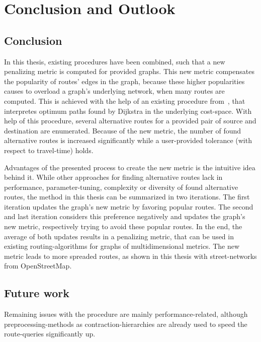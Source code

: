 \chapter{Conclusion and Outlook}
\label{chap:conclusion}

\section{Conclusion}

    In this thesis, existing procedures have been combined, such that a new penalizing metric is computed for provided graphs.
    This new metric compensates the popularity of routes' edges in the graph, because these higher popularities causes to overload a graph's underlying network, when many routes are computed.
    This is achieved with the help of an existing procedure from~\cite{barth:alternative_multicriteria_routes}, that interpretes optimum paths found by Dijkstra in the underlying cost-space.
    With help of this procedure, several alternative routes for a provided pair of source and destination are enumerated.
    Because of the new metric, the number of found alternative routes is increased significantly while a user-provided tolerance (with respect to travel-time) holds.

    Advantages of the presented process to create the new metric is the intuitive idea behind it.
    While other approaches for finding alternative routes lack in performance, parameter-tuning, complexity or diversity of found alternative routes, the method in this thesis can be summarized in two iterations.
    The first iteration updates the graph's new metric by favoring popular routes.
    The second and last iteration considers this preference negatively and updates the graph's new metric, respectively trying to avoid these popular routes.
    In the end, the average of both updates results in a penalizing metric, that can be used in existing routing-algorithms for graphs of multidimensional metrics.
    The new metric leads to more spreaded routes, as shown in this thesis with street-networks from OpenStreetMap.

\section{Future work}

    Remaining issues with the procedure are mainly performance-related, although preprocessing-methods as contraction-hierarchies are already used to speed the route-queries significantly up.

